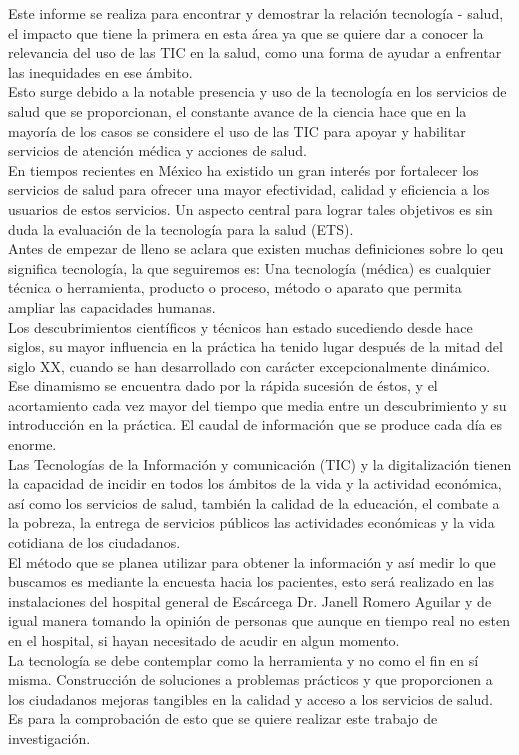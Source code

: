 \documentclass [a4paper, 12pt]{report}
\begin{document}
Este informe se realiza para encontrar y demostrar la relación tecnología - salud, el impacto que tiene la primera en esta área ya que se quiere dar a conocer la relevancia del uso de las TIC en la salud, como una forma de ayudar a enfrentar las inequidades en ese ámbito. \\
Esto surge debido a la notable presencia y uso de la tecnología  en los servicios de salud que se proporcionan, el constante avance de la ciencia hace que en la mayoría de los casos se considere el uso de las TIC para apoyar y habilitar servicios de atención médica y acciones de salud. \\
En tiempos recientes en México ha existido un gran interés por fortalecer los servicios de salud para ofrecer una mayor efectividad, calidad y eficiencia a los usuarios de estos servicios. Un aspecto central para lograr tales objetivos es sin duda la evaluación de la tecnología para la salud (ETS).\\
Antes de empezar de lleno se aclara que existen muchas definiciones sobre lo qeu significa tecnología, la que seguiremos es:
Una tecnología (médica) es cualquier técnica o herramienta, producto o proceso, método o aparato que permita ampliar las capacidades humanas.\\
Los descubrimientos científicos y técnicos han estado sucediendo desde hace siglos, su mayor influencia en la práctica ha tenido lugar después de la mitad del siglo XX, cuando se han desarrollado con carácter excepcionalmente dinámico. Ese dinamismo se encuentra dado por la rápida sucesión de éstos, y el acortamiento cada vez mayor del tiempo que media entre un descubrimiento y su introducción en la práctica. El caudal de información que se produce cada día es enorme.\\
Las Tecnologías de la Información y comunicación (TIC) y la digitalización tienen la capacidad de incidir en todos los ámbitos de la vida y la actividad económica, así como los servicios de salud, también la calidad de la educación, el combate a la pobreza, la entrega de servicios públicos las actividades económicas y la vida cotidiana de los ciudadanos. \\
El método que se planea utilizar para obtener la información y así medir lo que buscamos es mediante la encuesta hacia los pacientes, esto será realizado en las instalaciones del hospital general de Escárcega Dr. Janell Romero Aguilar y de igual manera tomando la opinión de personas que aunque en tiempo real no esten en el hospital, si hayan necesitado de acudir en algun momento.\\
La tecnología se debe contemplar como la herramienta y no como el fin en sí misma. Construcción de soluciones a problemas prácticos y que proporcionen a los ciudadanos mejoras tangibles en la calidad y acceso a los servicios de salud. Es para la comprobación de esto que se quiere realizar este trabajo de investigación.\\
\end{document}
